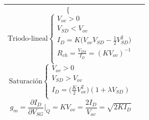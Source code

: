 \documentclass[../main.tex]{subfiles}
\begin{document}
\begin{xltabular}{\textwidth}{|X|X|}
$$\begin{cases}
		\end{cases}$$
	$$\text{Triodo-lineal}\begin{cases}
			V_{ov} > 0                                            \\
			V_{SD} < V_{ov}                                       \\
			I_D = K\bigg(V_{ov}V_{SD} - \frac{1}{2}V_{SD}^2\bigg) \\
			R_{ch} = \frac{V_{DS}}{I_D} = (KV_{ov})^{-1}          \\
		\end{cases}$$
	$$\text{Saturación}\begin{cases}
			V_{ov} > 0                                              \\
			V_{SD} > V_{ov}                                         \\
			I_D = \bigg(\frac{K}{2}V_{ov}^2\bigg)(1+\lambda V_{SD}) \\
		\end{cases}$$
	$$g_m = \frac{\partial I_D}{\partial V_{SG}}\bigg|_Q = KV_{ov} = \frac{2I_D}{V_{ov}} = \sqrt{2KI_D}$$
	\\
	\hline


\end{xltabular}
\end{document}
